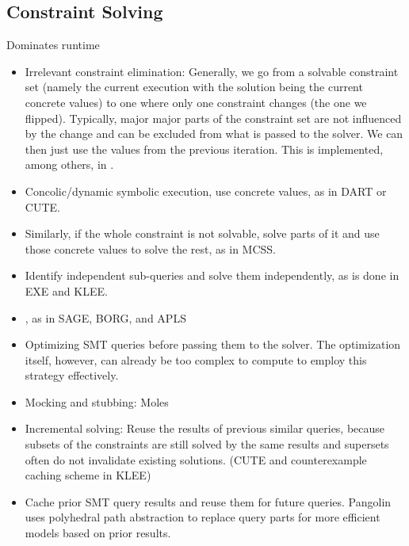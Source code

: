 \documentclass{article}
\begin{document}
\begin{multicols}{2}
  \subsection{Constraint Solving}
  \label{ConstraintSolving}
  Dominates runtime
  \begin{itemize}
    \item Irrelevant constraint elimination: Generally, we go from a solvable constraint set (namely the current execution with the solution being the current concrete values) to one where only one constraint changes (the one we flipped). Typically, major major parts of the constraint set are not influenced by the change and can be excluded from what is passed to the solver. We can then just use the values from the previous iteration. This is implemented, among others, in \cite{SAGE}.
    \item Concolic/dynamic symbolic execution, use concrete values, as in DART\cite{DART} or CUTE\cite{CUTE}.
    \item Similarly, if the whole constraint is not solvable, solve parts of it and use those concrete values to solve the rest, as in MCSS\cite{MCSS}.
    \item Identify independent sub-queries and solve them independently, as is done in EXE\cite{EXE} and KLEE\cite{KLEE}.
    \item {}\cite{Science}, as in SAGE\cite{SAGE}, BORG\cite{BORG}, and APLS\cite{APLS}
    \item Optimizing SMT queries before passing them to the solver. The optimization itself, however, can already be too complex to compute to employ this strategy effectively.
    \item Mocking and stubbing: Moles\cite{Moles}
    \item Incremental solving: Reuse the results of previous similar queries, because subsets of the constraints are still solved by the same results and supersets often do not invalidate existing solutions. (CUTE\cite{CUTE} and counterexample caching scheme in KLEE\cite{KLEE})
    \item Cache prior SMT query results and reuse them for future queries. Pangolin\cite{Pangolin} uses polyhedral path abstraction to replace query parts for more efficient models based on prior results.

\end{itemize}
\end{multicols}
\end{document}
